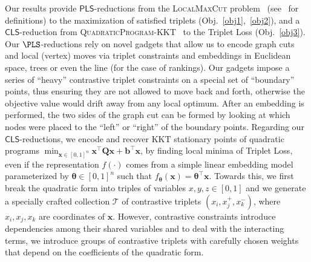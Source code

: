 \documentclass{article}
\theoremstyle{definition}  %
\theoremstyle{plain}
\numberwithin{observation}{section}
\numberwithin{claim}{section}
\numberwithin{fact}{section}
\numberwithin{lemma}{section}
\numberwithin{proposition}{section}
\numberwithin{theorem}{section}
\numberwithin{corollary}{section}
\numberwithin{definition}{section}
\def\vb{{\bm{b}}}
\def\vx{{\bm{x}}}
\newcommand{\vtheta}{\boldsymbol{\theta} }
\newcommand{\mat}[1]{\mathbf{#1}}
\newcommand{\CLS}{\mathsf{CLS}}
\theoremstyle{plain}
\begin{document}
Our results provide $\mathsf{PLS}$-reductions from the \textsc{LocalMaxCut} problem~\citep{schaffer1991simple} (see~ for definitions) to the maximization of satisfied triplets (Obj.~\ref{obj1},~\ref{obj2}), and a $\mathsf{CLS}$-reduction from \textsc{QuadraticProgram-KKT}~\citep{fearnley2024complexity} to the Triplet Loss (Obj.~\ref{obj3}). Our $\PLS$-reductions rely on novel gadgets that allow us to encode graph cuts and local (vertex) moves via triplet constraints and embeddings in Euclidean space, trees or even the line (for the case of rankings).  Our gadgets impose a series of ``heavy'' contrastive triplet constraints on a special set of ``boundary'' points, thus ensuring they are not allowed to move back and forth, otherwise the objective value would drift away from any local optimum. After an embedding is performed, the two sides of the graph cut can be formed by looking at which nodes were placed to the ``left'' or ``right'' of the boundary points. Regarding our $\CLS$-reductions, we encode and recover KKT stationary points of quadratic programs $\min_{\vx \in [0, 1]^n} \vx^\top \mat{Q} \vx + \vb^\top \vx$, by finding local minima of Triplet Loss, even if the representation $f(\cdot)$ comes from a simple linear embedding model parameterized by $\vtheta \in [0, 1]^n$ such that $f_{\vtheta}(\vx) = \vtheta^\top \vx$. Towards this, we first break the quadratic form into triples of variables $x, y, z \in [0, 1]$ and we generate a specially crafted collection $\mathcal{T}$ of contrastive triplets $(x_i,x_j^+,x_k^-)$, where $x_i,x_j,x_k$ are coordinates of $\vx$. However, contrastive constraints introduce dependencies among their shared variables and to deal with the interacting terms, we introduce groups of contrastive triplets with carefully chosen weights that depend on the coefficients of the quadratic form.
\end{document}
